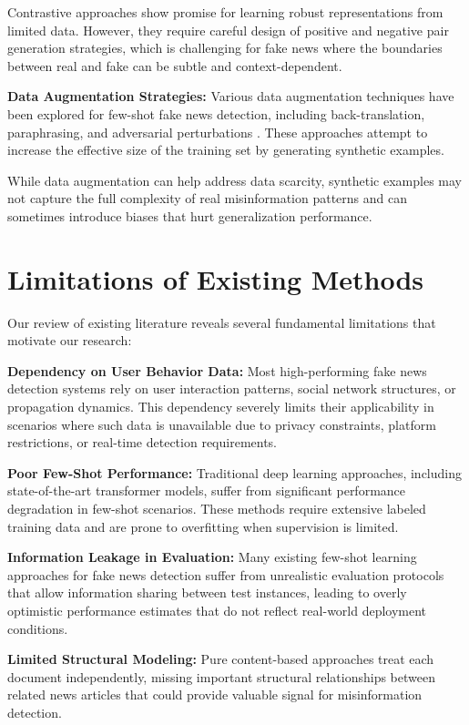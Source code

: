 Contrastive approaches show promise for learning robust representations from limited data. However, they require careful design of positive and negative pair generation strategies, which is challenging for fake news where the boundaries between real and fake can be subtle and context-dependent.

\textbf{Data Augmentation Strategies:} Various data augmentation techniques have been explored for few-shot fake news detection, including back-translation, paraphrasing, and adversarial perturbations \cite{longpre2020effective, kumar2020data}. These approaches attempt to increase the effective size of the training set by generating synthetic examples.

While data augmentation can help address data scarcity, synthetic examples may not capture the full complexity of real misinformation patterns and can sometimes introduce biases that hurt generalization performance.

\section{Limitations of Existing Methods}

Our review of existing literature reveals several fundamental limitations that motivate our research:

\textbf{Dependency on User Behavior Data:} Most high-performing fake news detection systems rely on user interaction patterns, social network structures, or propagation dynamics. This dependency severely limits their applicability in scenarios where such data is unavailable due to privacy constraints, platform restrictions, or real-time detection requirements.

\textbf{Poor Few-Shot Performance:} Traditional deep learning approaches, including state-of-the-art transformer models, suffer from significant performance degradation in few-shot scenarios. These methods require extensive labeled training data and are prone to overfitting when supervision is limited.

\textbf{Information Leakage in Evaluation:} Many existing few-shot learning approaches for fake news detection suffer from unrealistic evaluation protocols that allow information sharing between test instances, leading to overly optimistic performance estimates that do not reflect real-world deployment conditions.

\textbf{Limited Structural Modeling:} Pure content-based approaches treat each document independently, missing important structural relationships between related news articles that could provide valuable signal for misinformation detection.

